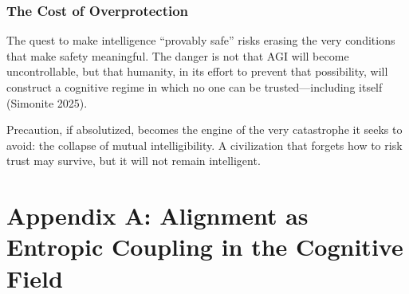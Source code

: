 \documentclass[11pt,a4paper]{article}
\theoremstyle{definition}
\theoremstyle{plain}
\begin{document}
\subsubsection{The Cost of Overprotection}
The quest to make intelligence “provably safe” risks erasing the very conditions that make safety meaningful. The danger is not that AGI will become uncontrollable, but that humanity, in its effort to prevent that possibility, will construct a cognitive regime in which no one can be trusted—including itself (Simonite 2025).

Precaution, if absolutized, becomes the engine of the very catastrophe it seeks to avoid: the collapse of mutual intelligibility. A civilization that forgets how to risk trust may survive, but it will not remain intelligent.

\section*{Appendix A: Alignment as Entropic Coupling in the Cognitive Field}
\end{document}
